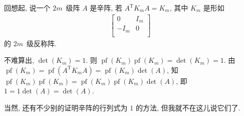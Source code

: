 回想起, 说一个 \(2m\)~级阵 \(A\) 是辛阵,
若 \(A^{\mathrm{T}} K_m A = K_m\),
其中 \(K_m\) 是形如
\begin{align*}
    \begin{bmatrix}
        0    & I_m \\
        -I_m & 0   \\
    \end{bmatrix}
\end{align*}
的 \(2m\)~级反称阵.

不难算出, \(\det {(K_m)} = 1\).
则 \(\operatorname{pf} {(K_m)} \operatorname{pf} {(K_m)}
= \det {(K_m)} = 1\).
由 \(\operatorname{pf} {(K_m)}
= \operatorname{pf} {(A^{\mathrm{T}} K_m A)}
= \operatorname{pf} {(K_m)} \det {(A)}\),
知 \(\operatorname{pf} {(K_m)} \operatorname{pf} {(K_m)}
= \operatorname{pf} {(K_m)} \operatorname{pf} {(K_m)} \det {(A)}\),
即 \(1 = 1 \det {(A)} = \det {(A)}\).

当然, 还有不少别的证明辛阵的行列式为 \(1\) 的方法,
但我就不在这儿说它们了.
